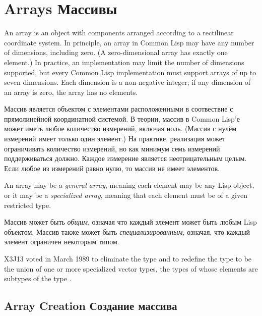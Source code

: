 
\clearpage\def\pagestatus{FINAL PROOF}

\chapter{Arrays Массивы}

An array is an object with components arranged according
to a rectilinear coordinate system.
In principle, an
array in Common Lisp may have any number of dimensions, including zero.
(A zero-dimensional array has exactly one element.)
In practice, an implementation may limit the number of dimensions
supported, but
every Common Lisp implementation must support arrays of up to
seven dimensions.
Each dimension is a non-negative integer; if any dimension of an array is zero,
the array has no elements.

Массив является объектом с элементами расположенными в соотвествие с прямолинейной
координатной системой.
В теории, массив в Common Lisp'е может иметь любое количество измерений, включая
ноль.
(Массив с нулём измерений имеет только один элемент.)
На практике, реализация может ограничивать количество измерений,
но как минимум семь измерений поддерживаться должно.
Каждое измерение является неотрицательным целым. Если любое из измерений равно
нулю, то массив не имеет элементов.

An array may be a \emph{general array}, meaning each element may be any Lisp
object, or it may be a \emph{specialized array}, meaning that each element
must be of a given restricted type.

Массив может быть \emph{общим}, означая что каждый элемент может быть
любым Lisp объектом. Массив также может быть \emph{специализированным}, означая,
что каждый элемент ограничен некоторым типом.

\begin{newer}
X3J13 voted in March 1989 
to eliminate the type  and to redefine the type
 to be the union of one or more specialized vector
types, the types of whose elements are subtypes of the type .
\end{newer}

\section{Array Creation Создание массива}

